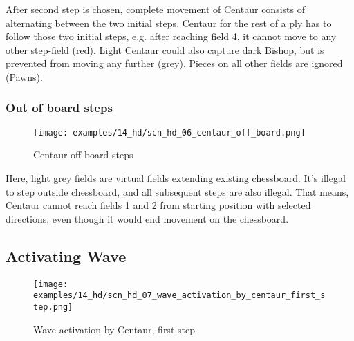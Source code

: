 After second step is chosen, complete movement of Centaur consists of alternating between the two initial
steps. Centaur for the rest of a ply has to follow those two initial steps, e.g. after reaching field 4,
it cannot move to any other step-field (red). Light Centaur could also capture dark Bishop, but is prevented
from moving any further (grey). Pieces on all other fields are ignored (Pawns).

\clearpage %

\subsubsection*{Out of board steps}

\vspace*{-0.05\textwidth}
\noindent
\begin{figure}[!h]
\texttt{[image: examples/14\_hd/scn\_hd\_06\_centaur\_off\_board.png]}
\caption{Centaur off-board steps}
\label{fig:scn_hd_06_centaur_off_board}
\end{figure}

Here, light grey fields are virtual fields extending existing chessboard.
It's illegal to step outside chessboard, and all subsequent steps are also
illegal. That means, Centaur cannot reach fields 1 and 2 from starting
position with selected directions, even though it would end movement on the
chessboard.

\clearpage %

\subsection*{Activating Wave}

\noindent
\begin{figure}[!h]
\texttt{[image: examples/14\_hd/scn\_hd\_07\_wave\_activation\_by\_centaur\_first\_step.png]}
\caption{Wave activation by Centaur, first step}
\label{fig:scn_hd_07_wave_activation_by_centaur_first_step}
\end{figure}

